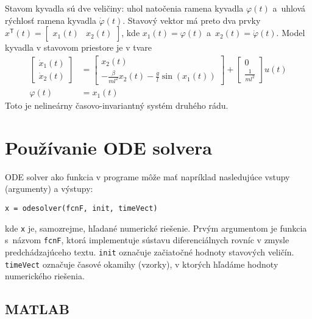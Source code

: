 \documentclass[a4paper, 10pt, ]{article}
\begin{document}
Stavom kyvadla sú dve veličiny: uhol natočenia ramena kyvadla $\varphi(t)$ a~uhlová rýchlosť ramena kyvadla $\dot\varphi(t)$. Stavový vektor má preto dva prvky $x^{\mathsf{T}}(t) = \begin{bmatrix} x_1(t) & x_2(t)	\end{bmatrix}$, kde $x_1(t) = \varphi(t)$ a~$x_2(t) = \dot\varphi(t)$. Model kyvadla v stavovom priestore je v tvare
\begin{subequations}
	\begin{align}
		\begin{bmatrix}
			\dot{x}_1(t) \\ \dot{x}_2(t)
		\end{bmatrix}
		&=
		\begin{bmatrix}
			x_2(t) \\ - \frac{\beta}{ml^2} x_2(t) - \frac{g}{l} \sin(x_1(t))
		\end{bmatrix}
		+
		\begin{bmatrix}
			0 \\ \frac{1}{ml^2}
		\end{bmatrix}
		u(t) \\
		\varphi(t) &= x_1(t)
	\end{align}
\end{subequations}
Toto je nelineárny časovo-invariantný systém druhého rádu.







\section{Používanie ODE solvera}

ODE solver ako funkcia v programe môže mať napríklad nasledujúce vstupy (argumenty) a výstupy:

\begin{verbatim}
x = odesolver(fcnF, init, timeVect)
\end{verbatim}
kde \verb|x| je, samozrejme, hľadané numerické riešenie. Prvým argumentom je funkcia s~názvom \verb|fcnF|, ktorá implementuje sústavu diferenciálnych rovníc v zmysle predchádzajúceho textu. \verb|init| označuje začiatočné hodnoty stavových veličín. \verb|timeVect| označuje časové okamihy (vzorky), v ktorých hľadáme hodnoty numerického riešenia.



\subsection{MATLAB}
\end{document}
